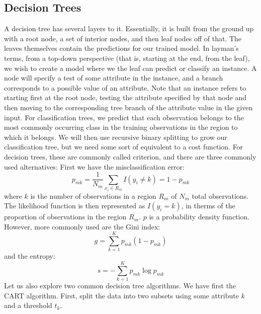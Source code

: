 \documentclass{article}
\begin{document}
\subsection{Decision Trees}
A decision tree has several layers to it. Essentially, it is built from the ground up with a root node, a set of interior nodes, and then leaf nodes off of that. The leaves themselves contain the predictions for our trained model. \newline
In layman's terms, from a top-down perspective (that is, starting at the end, from the leaf), we wish to create a model where we the leaf can predict or classify an instance. A node will specify a test of some attribute in the instance, and a branch corresponds to a possible value of an attribute. \newline
Note that an instance refers to starting first at the root node, testing the attribute specified by that node and then moving to the corresponding tree branch of the attribute value in the given input. \newline
For classification trees, we predict that each observation belongs to the most commonly occurring class in the training observations in the region to which it belongs. \newline
We will then use recursive binary splitting to grow our classification tree, but we need some sort of equivalent to a cost function. For decision trees, these are commonly called criterion, and there are three commonly used alternatives:
\newline First we have the misclassification error:
\begin{equation*}
    p_{mk} = \frac{1}{N_m} \sum_{x_i \in R_m} I(y_i \neq k) = 1 - p_{mk}
\end{equation*}
where $k$ is the number of observations in a region $R_m$ of $N_m$ total observations. The likelihood function is then represented as $I(y_i = k)$, in therms of the proportion of observations in the region $R_m$. $p$ is a probability density function.
\newline However, more commonly used are the Gini index:
\begin{equation*}
    g = \sum_{k=1}^K p_{mk}(1-p_{mk})
\end{equation*}
and the entropy:
\begin{equation*}
    s = - \sum_{k=1}^K p_{mk} \log p_{mk}
\end{equation*}
Let us also explore two common decision tree algorithms. We have first the CART algorithm.
\newline First, split the data into two subsets using some attribute $k$ and a threshold $t_k$. \newline
\end{document}
